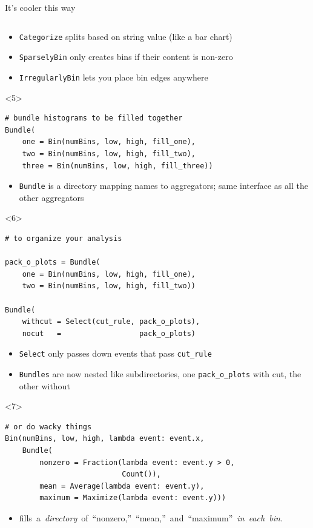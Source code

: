 \documentclass{beamer}
\begin{document}
\begin{frame}[fragile]{It's cooler this way}
\begin{onlyenv}
\begin{verbatim}
\end{verbatim}
\begin{itemize}
\item {\tt\small Categorize} splits based on string value (like a bar chart)
\item {\tt\small SparselyBin} only creates bins if their content is non-zero
\item {\tt\small IrregularlyBin} lets you place bin edges anywhere
\end{itemize}\end{onlyenv}
\begin{onlyenv}<5>
\begin{verbatim}
# bundle histograms to be filled together
Bundle(
    one = Bin(numBins, low, high, fill_one),
    two = Bin(numBins, low, high, fill_two),
    three = Bin(numBins, low, high, fill_three))
\end{verbatim}
\begin{itemize}
\item {\tt\small Bundle} is a directory mapping names to aggregators; same interface as all the other aggregators
\end{itemize}\end{onlyenv}
\begin{onlyenv}<6>
\begin{verbatim}
# to organize your analysis

pack_o_plots = Bundle(
    one = Bin(numBins, low, high, fill_one),
    two = Bin(numBins, low, high, fill_two))

Bundle(
    withcut = Select(cut_rule, pack_o_plots),
    nocut   =                  pack_o_plots)
\end{verbatim}
\begin{itemize}
\item {\tt\small Select} only passes down events that pass {\tt\small cut\_rule}
\item {\tt\small Bundles} are now nested like subdirectories, one {\tt\small pack\_o\_plots} with cut, the other without
\end{itemize}\end{onlyenv}
\begin{onlyenv}<7>
\begin{verbatim}
# or do wacky things
Bin(numBins, low, high, lambda event: event.x,
    Bundle(
        nonzero = Fraction(lambda event: event.y > 0,
                           Count()),
        mean = Average(lambda event: event.y),
        maximum = Maximize(lambda event: event.y)))
\end{verbatim}
\begin{itemize}
\item \mbox{fills a {\it directory} of ``nonzero,'' ``mean,'' and ``maximum'' {\it in each bin.}\hspace{-1 cm}}
\end{itemize}\end{onlyenv}
\end{frame}
\end{document}
